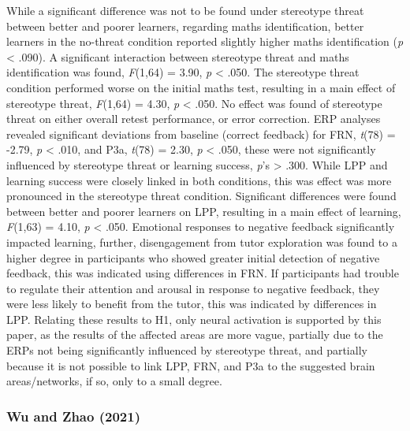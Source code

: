 \documentclass[
  stu,floatsintext]{apa7}
\begin{document}
While a significant difference was not to be found under stereotype threat between better and poorer learners, regarding maths identification, better learners in the no-threat condition reported slightly higher maths identification (\emph{p} \textless{} .090).
A significant interaction between stereotype threat and maths identification was found, \emph{F}(1,64) = 3.90, \emph{p} \textless{} .050.
The stereotype threat condition performed worse on the initial maths test, resulting in a main effect of stereotype threat, \emph{F}(1,64) = 4.30, \emph{p} \textless{} .050.
No effect was found of stereotype threat on either overall retest performance, or error correction.
ERP analyses revealed significant deviations from baseline (correct feedback) for FRN, \emph{t}(78) = -2.79, \emph{p} \textless{} .010, and P3a, \emph{t}(78) = 2.30, \emph{p} \textless{} .050, these were not significantly influenced by stereotype threat or learning success, \emph{p}'s \textgreater{} .300.
While LPP and learning success were closely linked in both conditions, this was effect was more pronounced in the stereotype threat condition.
Significant differences were found between better and poorer learners on LPP, resulting in a main effect of learning, \emph{F}(1,63) = 4.10, \emph{p} \textless{} .050.
Emotional responses to negative feedback significantly impacted learning, further, disengagement from tutor exploration was found to a higher degree in participants who showed greater initial detection of negative feedback, this was indicated using differences in FRN.
If participants had trouble to regulate their attention and arousal in response to negative feedback, they were less likely to benefit from the tutor, this was indicated by differences in LPP.
Relating these results to H1, only neural activation is supported by this paper, as the results of the affected areas are more vague, partially due to the ERPs not being significantly influenced by stereotype threat, and partially because it is not possible to link LPP, FRN, and P3a to the suggested brain areas/networks, if so, only to a small degree.

\subsubsection{Wu and Zhao (2021)}\label{wudegreecentralitybrain2021}
\end{document}
